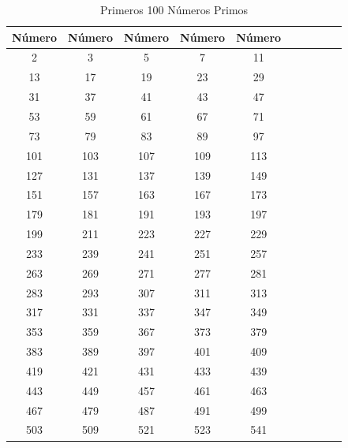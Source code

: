 \documentclass{article}
\begin{document}
\begin{table}[h]
    \centering
    \caption{Primeros 100 Números Primos}
    \label{tab:primos}
    \begin{tabular}{*{10}{c}}
        \hline
        \textbf{Número} & \textbf{Número} & \textbf{Número} & \textbf{Número} & \textbf{Número} \\
        \hline
2 & 3 & 5 & 7 & 11 \\
13 & 17 & 19 & 23 & 29 \\
31 & 37 & 41 & 43 & 47 \\
53 & 59 & 61 & 67 & 71 \\
73 & 79 & 83 & 89 & 97 \\
101 & 103 & 107 & 109 & 113 \\
127 & 131 & 137 & 139 & 149 \\
151 & 157 & 163 & 167 & 173 \\
179 & 181 & 191 & 193 & 197 \\
199 & 211 & 223 & 227 & 229 \\
233 & 239 & 241 & 251 & 257 \\
263 & 269 & 271 & 277 & 281 \\
283 & 293 & 307 & 311 & 313 \\
317 & 331 & 337 & 347 & 349 \\
353 & 359 & 367 & 373 & 379 \\
383 & 389 & 397 & 401 & 409 \\
419 & 421 & 431 & 433 & 439 \\
443 & 449 & 457 & 461 & 463 \\
467 & 479 & 487 & 491 & 499 \\
503 & 509 & 521 & 523 & 541 \\
\end{tabular}
\end{table}
\end{document}
